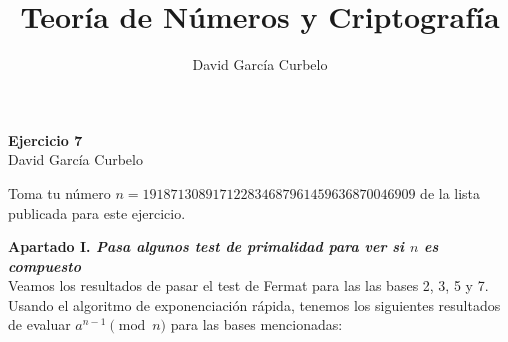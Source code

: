 \documentclass[fleqn]{article}
\author{David García Curbelo}
\title{Teoría de Números y Criptografía}
\begin{document}
    \begin{center}
        \LARGE{\textbf{Ejercicio 7}} \\
        \Large{David García Curbelo} \\
    \end{center}

    \vspace{1cm}
    Toma tu número $n=191871308917122834687961459636870046909$ de la lista publicada para este ejercicio.


    \textbf{Apartado I. \textit{Pasa algunos test de primalidad para ver si $n$ es compuesto}}\\
    Veamos los resultados de pasar el test de Fermat para las las bases 2, 3, 5 y 7. Usando el algoritmo de exponenciación rápida, tenemos
    los siguientes resultados de evaluar $a^{n-1} \pmod{n}$ para las bases mencionadas:
\end{document}
